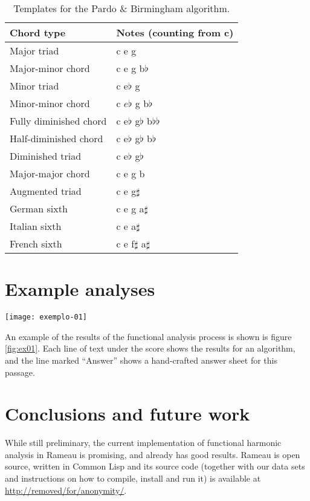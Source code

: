 \begin{table}[h]
  \centering
  \begin{small}
    \begin{sc}
      \begin{tabular}[t]{ll} \hline
        Chord type & Notes (counting from c) \\ \hline
        Major triad & c e g \\
        Major-minor chord &  c e g b$\flat$ \\
        Minor triad & c e$\flat$ g \\
        Minor-minor chord & c $e\flat$ g b$\flat$ \\
        Fully diminished chord & c e$\flat$ g$\flat$ b$\flat\flat$ \\
        Half-diminished chord & c e$\flat$ g$\flat$ b$\flat$ \\
        Diminished triad & c e$\flat$ g$\flat$ \\
        Major-major chord & c e g b \\
        Augmented triad & c e g$\sharp$ \\
        German sixth  & c e g a$\sharp$ \\
        Italian sixth & c e a$\sharp$ \\
        French sixth & c e f$\sharp$ a$\sharp$ \\ \hline
      \end{tabular}
    \end{sc}
  \end{small}
  \caption{Templates for the Pardo \& Birmingham algorithm.}
  \label{tab:templates-pardo}
\end{table}

\section{Example analyses}
\label{sec:example-analyses}

\begin{figure*}[t]
  \centering
  \texttt{[image: exemplo-01]}
  \caption{An excerpt of the analysis of Bach chorale \#20.}
  \label{fig:ex01}
\end{figure*}

An example of the results of the functional analysis process is shown
is figure \ref{fig:ex01}. Each line of text under the score shows the
results for an algorithm, and the line marked ``Answer'' shows a
hand-crafted answer sheet for this passage.

\section{Conclusions and future work}
\label{sec:concl-future-work}

While still preliminary, the current implementation of functional
harmonic analysis in Rameau is promising, and already has good
results. Rameau is open source, written in Common Lisp and its source
code (together with our data sets and instructions on how to compile,
install and run it) is available at
\url{http://removed/for/anonymity/}.


